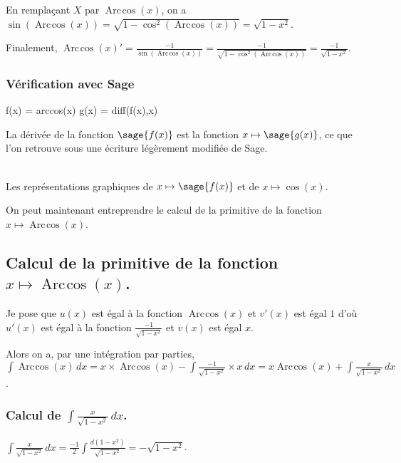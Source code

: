 \documentclass[a4paper,12pt]{report}
\renewcommand{\arccos}{\mathop{\mathrm{Arc\mspace{2mu}cos}}}
\begin{document}
En remplaçant $X$ par $\arccos(x)$, 
on a $\sin(\arccos(x)) = \sqrt{1-\cos^2(\arccos(x))} = \sqrt{1- x^2}$.

Finalement, $\arccos(x)' = \frac{-1}{\sin(\arccos(x))} = \frac{-1}{\sqrt{1-\cos^2(\arccos(x))}} =  \frac{-1}{\sqrt{1- x^2}} $.

\subsubsection*{Vérification avec Sage}

\begin{sageblock}
    f(x) = arccos(x)
    g(x) = diff(f(x),x)
\end{sageblock}

La dérivée de la fonction $\sage{f(x)}$ est la fonction $x \mapsto \sage{g(x)} $, ce que l'on retrouve sous une écriture légèrement modifiée de Sage.


\begin{center}
\\
Les représentations graphiques de $x \mapsto \sage{f(x)} $ et de $x\mapsto \cos(x)$.
\end{center}

On peut maintenant entreprendre le calcul de la primitive de la  fonction  $x \mapsto \arccos(x) $.

\subsection{Calcul de la primitive de la fonction  $x \mapsto \arccos(x) $.}


Je pose que $u(x)$  est égal à la fonction $\arccos(x)$ et $v'(x)$ est égal $1$  d'où $u'(x)$  est égal à la fonction $ \frac{-1}{\sqrt{1- x^2}} $ et $v(x)$ est égal $x$.

Alors on a, par une intégration par parties, $\int \arccos(x) \, dx = x \times \arccos(x) -\int \frac{-1}{\sqrt{1- x^2}} \times x \, dx =  x \arccos(x) + \int \frac{x}{\sqrt{1- x^2}} \, dx $.


\subsubsection*{Calcul de $\int \frac{x}{\sqrt{1- x^2}} \, dx $.}

$\int \frac{x}{\sqrt{1- x^2}} \, dx = \frac{-1}{2} \int \frac{d(1-x^2)}{\sqrt{1- x^2}}= -\sqrt{1- x^2} $.
\end{document}
